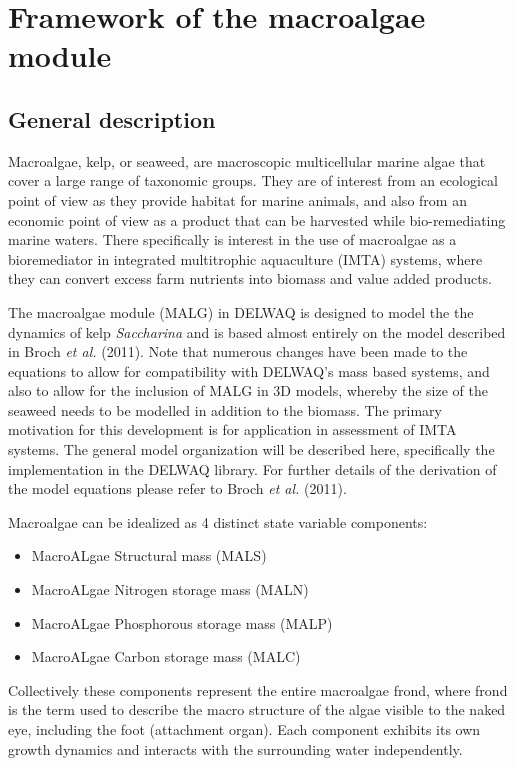\documentclass{deltares_manual}
\begin{document}
\section{Framework of the macroalgae module}

\subsection{General description}

Macroalgae, kelp, or seaweed, are macroscopic multicellular marine algae that cover a large range of taxonomic groups. They are of interest from an ecological point of view as they provide habitat for marine animals, and also from an economic point of view as a product that can be harvested while bio-remediating marine waters. There specifically is interest in the use of macroalgae as a bioremediator in integrated multitrophic aquaculture (IMTA) systems, where they can convert excess farm nutrients into biomass and value added products. 

The macroalgae module (MALG) in DELWAQ is designed to model the the dynamics of kelp \textit{Saccharina} and is based almost entirely on the model described in Broch \textit{et al.} (2011). Note that numerous changes have been made to the equations to allow for compatibility with DELWAQ's mass based systems, and also to allow for the inclusion of MALG in 3D models, whereby the size of the seaweed needs to be modelled in addition to the biomass. The primary motivation for this development is for application in assessment of IMTA systems. The general model organization will be described here, specifically the implementation in the DELWAQ library. For further details of the derivation of the model equations please refer to Broch \textit{et al.} (2011).

Macroalgae can be idealized as 4 distinct state variable components:
\begin{itemize}
\item MacroALgae Structural mass (MALS)
\item MacroALgae Nitrogen storage mass (MALN)
\item MacroALgae Phosphorous storage mass (MALP)
\item MacroALgae Carbon storage mass (MALC)
\end{itemize}
Collectively these components represent the entire macroalgae frond, where frond is the term used to describe the macro structure of the algae visible to the naked eye, including the foot (attachment organ). Each component exhibits its own growth dynamics and interacts with the surrounding water independently. 
\end{document}
